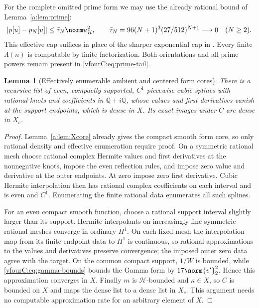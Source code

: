 \documentclass[11pt,a4paper]{article}
\numberwithin{equation}{section}
\newtheorem{lemma}[theorem]{Lemma}
\theoremstyle{definition}\newtheorem{definition}[theorem]{Definition}
\theoremstyle{remark}\newtheorem{remark}[theorem]{Remark}
\newcommand{\Hh}{\mathcal H}\newcommand{\Hw}{\mathcal H}
\begin{document}
For the complete omitted prime form we may use the already rational bound of
Lemma~\ref{a:lem:prime}:
\begin{equation}\label{vfourC:eq:prime-tail}
 |p[u]-p_N[u]|\le\bar\tau_N\norm u_{\Hh}^2,\qquad
 \bar\tau_N=96(N+1)^3(27/512)^{N+1}\longrightarrow0
 \quad(N\ge2).
\end{equation}
This effective cap suffices in place of the sharper exponential cap in
\cite{vfourComputable}.  Every finite $\Lambda(n)$ is computable by finite
factorization.  Both orientations and all prime powers remain present in
\eqref{vfourC:eq:prime-tail}.

\begin{lemma}[Effectively enumerable ambient and centered form cores]
\label{vfourC:lem:core}
There is a recursive list of even, compactly supported, $C^1$ piecewise cubic
splines with rational knots and coefficients in $\mathbb Q+i\mathbb Q$, whose
values and first derivatives vanish at the support endpoints, which is dense in
$X$.  Its exact images under $C$ are dense in $X_c$.
\end{lemma}
\begin{proof}
Lemma~\ref{a:lem:Xcore} already gives the compact smooth form core, so only
rational density and effective enumeration require proof.  On a symmetric
rational mesh choose rational complex Hermite values and first derivatives at
the nonnegative knots, impose the even reflection rules, and impose zero value
and derivative at the outer endpoints.  At zero impose zero first derivative.
Cubic Hermite interpolation then has rational complex coefficients on each
interval and is even and $C^1$.  Enumerating the finite rational data enumerates
all such splines.

For an even compact smooth function, choose a rational support interval slightly
larger than its support.  Hermite interpolants on increasingly fine symmetric
rational meshes converge in ordinary $H^1$.  On each fixed mesh the interpolation
map from its finite endpoint data to $H^1$ is continuous, so rational
approximations to the values and derivatives preserve convergence; the imposed
outer zero data agree with the target.  On the common compact support,
$1/W$ is bounded, while \eqref{vfourC:eq:gamma-bounds} bounds the Gamma form by
$17\norm{v'}_2^2$.  Hence this approximation converges in $X$.  Finally $m$ is
$\Hh$-bounded and $\kappa\in X$, so $C$ is bounded on $X$ and maps the dense list
to a dense list in $X_c$.  This argument needs no computable approximation rate
for an arbitrary element of $X$.
\end{proof}
\end{document}
